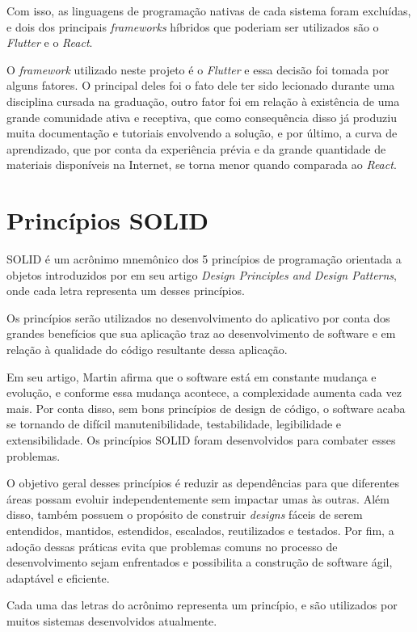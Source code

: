 Com isso, as linguagens de programação nativas de cada sistema foram excluídas, e dois dos principais \textit{frameworks} híbridos que poderiam ser utilizados são o \textit{Flutter} e o \textit{React}.

O \textit{framework} utilizado neste projeto é o \textit{Flutter} e essa decisão foi tomada por alguns fatores. O principal deles foi o fato dele ter sido lecionado durante uma disciplina cursada na graduação, outro fator foi em relação à existência de uma grande comunidade ativa e receptiva, que como consequência disso já produziu muita documentação e tutoriais envolvendo a solução, e por último, a curva de aprendizado, que por conta da experiência prévia e da grande quantidade de materiais disponíveis na Internet, se torna menor quando comparada ao \textit{React}.

\section{Princípios SOLID}\label{sec:solid}
SOLID é um acrônimo mnemônico dos 5 princípios de programação orientada a objetos introduzidos por \textcite{unclebob} em seu artigo \textit{Design Principles and Design Patterns}, onde cada letra representa um desses princípios.

Os princípios serão utilizados no desenvolvimento do aplicativo por conta dos grandes benefícios que sua aplicação traz ao desenvolvimento de software e em relação à qualidade do código resultante dessa aplicação.

Em seu artigo, Martin afirma que o software está em constante mudança e evolução, e conforme essa mudança acontece, a complexidade aumenta cada vez mais. Por conta disso, sem bons princípios de design de código, o software acaba se tornando de difícil manutenibilidade, testabilidade, legibilidade e extensibilidade. Os princípios SOLID foram desenvolvidos para combater esses problemas.

O objetivo geral desses princípios é reduzir as dependências para que diferentes áreas possam evoluir independentemente sem impactar umas às outras. Além disso, também possuem o propósito de construir \textit{designs} fáceis de serem entendidos, mantidos, estendidos, escalados, reutilizados e testados. Por fim, a adoção dessas práticas evita que problemas comuns no processo de desenvolvimento sejam enfrentados e possibilita a construção de software ágil, adaptável e eficiente.

Cada uma das letras do acrônimo representa um princípio, e são utilizados por muitos sistemas desenvolvidos atualmente.

